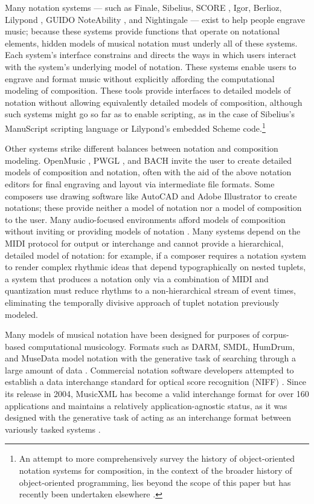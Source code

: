 \documentclass{article}
\begin{document}
Many notation systems --- such as Finale, Sibelius, SCORE \cite{Smith:1972mw},
Igor, Berlioz, Lilypond \cite{Nienhuys:2003ve}, GUIDO \cite{Hoos:1998bd}
NoteAbility \cite{hamel1noteability}, and Nightingale --- exist to help people
engrave music; because these systems provide functions that operate on
notational elements, hidden models of musical notation must underly all of
these systems. Each system's interface constrains and directs the ways in which
users interact with the system's underlying model of notation. These systems
enable users to engrave and format music without explicitly affording the
computational modeling of composition. These tools provide interfaces to
detailed models of notation without allowing equivalently detailed models of
composition, although such systems might go so far as to enable scripting, as
in the case of Sibelius's ManuScript \cite{Technology:qc} scripting language or
Lilypond's embedded Scheme code.\footnote{An attempt to more comprehensively
survey the history of object-oriented notation systems for composition, in the
context of the broader history of object-oriented programming, lies beyond the
scope of this paper but has recently been undertaken elsewhere
\cite{trevino2013compositional}.}

Other systems strike different balances between notation and composition
modeling. OpenMusic \cite{Assayag:1999sw}, PWGL \cite{Laurson:2009qf}, and BACH
\cite{agostini2013real} invite the user to create detailed models of
composition and notation, often with the aid of the above notation editors for
final engraving and layout via intermediate file formats. Some composers use
drawing software like AutoCAD and Adobe Illustrator to create notations; these
provide neither a model of notation nor a model of composition to the user.
Many audio-focused environments afford models of composition without inviting
or providing models of notation \cite{Ariza2005b}. Many systems depend on the
MIDI protocol for output or interchange and cannot provide a hierarchical,
detailed model of notation: for example, if a composer requires a notation
system to render complex rhythmic ideas that depend typographically on nested
tuplets, a system that produces a notation only via a combination of MIDI and
quantization must reduce rhythms to a non-hierarchical stream of event times,
eliminating the temporally divisive approach of tuplet notation previously
modeled.

Many models of musical notation have been designed for purposes of
corpus-based computational musicology. Formats such as DARM, SMDL,
HumDrum, and MuseData model notation with the generative task of searching
through a large amount of data \cite{Selfridge-Field:1997ud}. Commercial
notation software developers attempted to establish a data interchange standard
for optical score recognition (NIFF) \cite{niff1995niff}. Since its release in
2004, MusicXML has become a valid interchange format for over 160 applications
and maintains a relatively application-agnostic status, as it was designed with
the generative task of acting as an interchange format between variously tasked
systems \cite{Good:2001if}.
\end{document}
